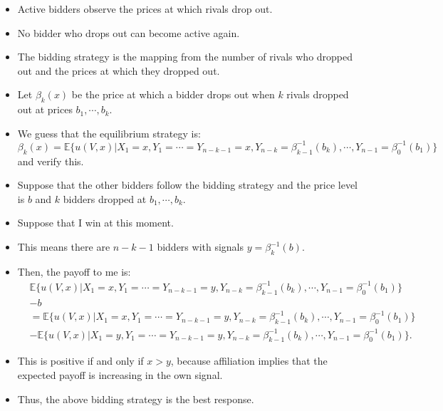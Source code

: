 \documentclass[
]{book}
\providecommand{\tightlist}{%
  \setlength{\itemsep}{0pt}\setlength{\parskip}{0pt}}
\begin{document}
\begin{itemize}
  \begin{itemize}
  \tightlist
  \item
    Active bidders observe the prices at which rivals drop out.
  \item
    No bidder who drops out can become active again.
  \item
    The bidding strategy is the mapping from the number of rivals who dropped out and the prices at which they dropped out.
  \item
    Let \(\beta_k(x)\) be the price at which a bidder drops out when \(k\) rivals dropped out at prices \(b_1, \cdots, b_k\).
  \item
    We guess that the equilibrium strategy is:
    \[
      \beta_k(x) = \mathbb{E}\{u(V, x)| X_1 = x, Y_1 = \cdots = Y_{n - k - 1} = x, Y_{n - k} = \beta_{k - 1}^{-1}(b_k), \cdots, Y_{n - 1} = \beta_0^{-1}(b_1)\}
      \]
    and verify this.
  \item
    Suppose that the other bidders follow the bidding strategy and the price level is \(b\) and \(k\) bidders dropped at \(b_1, \cdots, b_k\).
  \item
    Suppose that I win at this moment.
  \item
    This means there are \(n - k - 1\) bidders with signals \(y = \beta_k^{-1}(b)\).
  \item
    Then, the payoff to me is:
    \begin{equation}
      \begin{split}
      &\mathbb{E}\{u(V, x)| X_1 = x, Y_1 = \cdots = Y_{n - k - 1} = y, Y_{n - k} = \beta_{k - 1}^{-1}(b_k), \cdots, Y_{n - 1} = \beta_0^{-1}(b_1)\}\\
      &- b\\
      &=\mathbb{E}\{u(V, x)| X_1 = x, Y_1 = \cdots = Y_{n - k - 1} = y, Y_{n - k} = \beta_{k - 1}^{-1}(b_k), \cdots, Y_{n - 1} = \beta_0^{-1}(b_1)\}\\
      &- \mathbb{E}\{u(V, x)| X_1 = y, Y_1 = \cdots = Y_{n - k - 1} = y, Y_{n - k} = \beta_{k - 1}^{-1}(b_k), \cdots, Y_{n - 1} = \beta_0^{-1}(b_1)\}.
      \end{split}
      \end{equation}
  \item
    This is positive if and only if \(x > y\), because affiliation implies that the expected payoff is increasing in the own signal.
  \item
    Thus, the above bidding strategy is the best response.
  \end{itemize}
\end{itemize}
\end{document}
